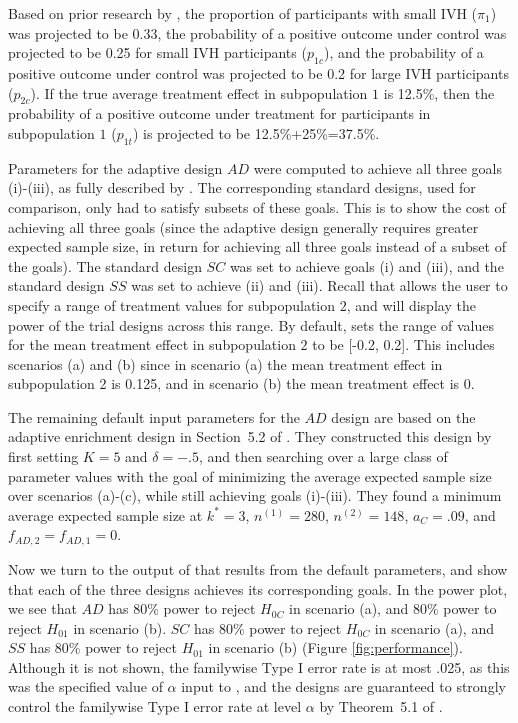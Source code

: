 \documentclass[article]{jss}
\begin{document}
Based on prior research by \cite{Hanley2012}, the proportion of participants with small IVH ($π_1$) was projected to be 0.33, the probability of a positive outcome under control was projected to be 0.25 for small IVH participants ($p_{1c}$), and the probability of a positive outcome under control was projected to be  0.2 for large IVH participants ($p_{2c}$).  If the true average treatment effect in subpopulation $1$ is 12.5\%, then the probability of a positive outcome under treatment for participants in subpopulation $1$ ($p_{1t}$) is projected to be 12.5\%+25\%=37.5\%.

Parameters for the adaptive design $AD$ were computed to achieve all three goals (i)-(iii), as fully described by \citep{Rosenblum2013AdaptMISTIE}. The corresponding standard designs, used for comparison, only had to satisfy subsets of these goals. This is to show the cost of achieving all three goals (since the adaptive design generally requires greater expected sample size, in return for achieving all three goals instead of a subset of the goals). 
The standard design $SC$ was set to achieve goals (i) and (iii), and the standard design $SS$ was set to achieve (ii) and (iii). Recall that  allows the user to specify a range of treatment values for subpopulation $2$, and will display the power of the trial designs across this range. By default,  sets the range of values for the mean treatment effect in subpopulation $2$ to be [-0.2, 0.2]. This includes scenarios (a) and (b) since in scenario (a) the mean treatment effect in subpopulation 2 is 0.125, and in scenario (b) the mean treatment effect is $0$. 

The remaining default input parameters for the $AD$ design are based on the adaptive enrichment design in Section~5.2 of \citep{Rosenblum2013AdaptMISTIE}. 
They constructed this design by first setting  $K=5$ and $δ=-.5$, and then searching over a large class of parameter values with the goal of minimizing the average expected sample size over scenarios (a)-(c), while still achieving goals (i)-(iii). They found a minimum average expected sample size at $k^*=3$, $n^{(1)}=280$, $n^{(2)}=148$, $a_C = .09$, and $f_{AD,2}=f_{AD,1}=0$. 


Now we turn to the output of  that results from the default parameters, and show that each of the three designs achieves its corresponding goals. In the power plot, we see that $AD$ has 80\% power to reject $H_{0C}$ in scenario (a), and 80\% power to reject $H_{01}$ in scenario (b). $SC$ has 80\% power to reject $H_{0C}$ in scenario (a), and $SS$ has 80\% power to reject $H_{01}$ in scenario (b) (Figure \ref{fig:performance}). Although it is not shown,  the familywise Type I error rate is at most  .025, as this was the specified value of $\alpha$ input to , and the designs are guaranteed to strongly control the familywise Type I error rate at level $\alpha$ by
 Theorem~5.1 of  \citep{Rosenblum2013AdaptMISTIE}.
\end{document}

